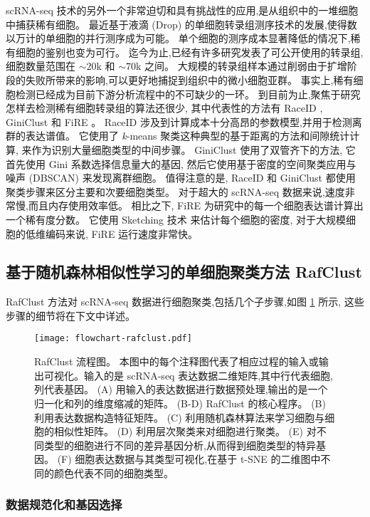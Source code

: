 scRNA-seq 技术的另外一个非常迫切和具有挑战性的应用,是从组织中的一堆细胞中捕获稀有细胞。
最近基于液滴 (Drop) 的单细胞转录组测序技术的发展,使得数以万计的单细胞的并行测序成为可能。
单个细胞的测序成本显著降低的情况下,稀有细胞的鉴别也变为可行。
迄今为止,已经有许多研究发表了可公开使用的转录组,细胞数量范围在 ${\sim} 20$k 和 ${\sim} 70$k 之间。
大规模的转录组样本通过削弱由于扩增阶段的失败所带来的影响,可以更好地捕捉到组织中的微小细胞亚群。
事实上,稀有细胞检测已经成为目前下游分析流程中的不可缺少的一环。
到目前为止,聚焦于研究怎样去检测稀有细胞转录组的算法还很少,
其中代表性的方法有 RaceID \cite{grun2015single}, GiniClust \cite{jiang2016giniclust} 和 FiRE \cite{jindal2018discovery}。
RaceID 涉及到计算成本十分高昂的参数模型,并用于检测离群的表达谱值。
它使用了 \textit{k}-means 聚类这种典型的基于距离的方法和间隙统计计算,
来作为识别大量细胞类型的中间步骤。
 GiniClust 使用了双管齐下的方法,
它首先使用 Gini 系数选择信息量大的基因,
然后它使用基于密度的空间聚类应用与噪声 (DBSCAN) \cite{ester1996density} 来发现离群细胞。
值得注意的是, RaceID 和 GiniClust 都使用聚类步骤来区分主要和次要细胞类型。
对于超大的 scRNA-seq 数据来说,速度非常慢,而且内存使用效率低。
相比之下, FiRE 为研究中的每一个细胞表达谱计算出一个稀有度分数。
它使用 Sketching 技术 \cite{wang2007sizing}来估计每个细胞的密度,
对于大规模细胞的低维编码来说, FiRE 运行速度非常快。

\subsection{基于随机森林相似性学习的单细胞聚类方法 RafClust}
\label{sec:method}

RafClust 方法对 scRNA-seq 数据进行细胞聚类,包括几个子步骤,如图 \ref{fig:rafclust} 所示, 这些步骤的细节将在下文中详述。
\begin{figure}[!htbp]
    \centering
    \texttt{[image: flowchart-rafclust.pdf]}
    \caption{RafClust 流程图。
    本图中的每个注释图代表了相应过程的输入或输出可视化。输入的是 scRNA-seq 表达数据二维矩阵,其中行代表细胞,列代表基因。
    (A) 用输入的表达数据进行数据预处理,输出的是一个归一化和列的维度缩减的矩阵。
    (B-D) RafClust 的核心程序。
    (B) 利用表达数据构造特征矩阵。
    (C) 利用随机森林算法来学习细胞与细胞的相似性矩阵。
    (D) 利用层次聚类来对细胞进行聚类。
    (E) 对不同类型的细胞进行不同的差异基因分析,从而得到细胞类型的特异基因。
    (F) 细胞表达数据与其类型可视化,在基于 t-SNE 的二维图中不同的颜色代表不同的细胞类型。
    }
    \label{fig:rafclust}
\end{figure}

\subsubsection{数据规范化和基因选择}
\label{subsec:datapreprocessing} 

